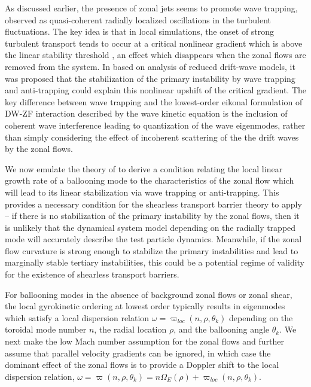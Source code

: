 \documentclass[]{article}
\begin{document}
As discussed earlier, the presence of zonal jets seems to promote wave trapping, observed as quasi-coherent radially localized oscillations in the turbulent fluctuations.
The key idea is that in local simulations, the onset of strong turbulent transport tends to occur at a critical nonlinear gradient which is above the linear stability threshold \citep{dimits_comparisons_2000}, an effect which disappears when the zonal flows are removed from the system.
In \citet{zhu_theory_2020,zhu_theory_jpp_2020} based on analysis of reduced drift-wave models, it was proposed that the stabilization of the primary instability by wave trapping and anti-trapping could explain this nonlinear upshift of the critical gradient.
The key difference between wave trapping and the lowest-order eikonal formulation of DW-ZF interaction described by the wave kinetic equation is the inclusion of coherent wave interference leading to quantization of the wave eigenmodes, rather than simply considering the effect of incoherent scattering of the the drift waves by the zonal flows.

We now emulate the theory of \citet{zhu_theory_2020} to derive a condition relating the local linear growth rate of a ballooning mode to the characteristics of the zonal flow which will lead to its linear stabilization via wave trapping or anti-trapping.
This provides a necessary condition for the shearless transport barrier theory to apply -- if there is no stabilization of the primary instability by the zonal flows, then it is unlikely that the dynamical system model depending on the radially trapped mode will accurately describe the test particle dynamics.
Meanwhile, if the zonal flow curvature is strong enough to stabilize the primary instabilities and lead to marginally stable tertiary instabilities, this could be a potential regime of validity for the existence of shearless transport barriers.

For ballooning modes in the absence of background zonal flows or zonal shear, the local gyrokinetic ordering at lowest order typically results in eigenmodes which satisfy a local dispersion relation \(\omega = \varpi_{loc}(n,\rho,\theta_k)\) depending on the toroidal mode number \(n\), the radial location \(\rho\), and the ballooning angle \(\theta_k\).
We next make the low Mach number assumption for the zonal flows and further assume that parallel velocity gradients can be ignored, in which case the dominant effect of the zonal flows is to provide a Doppler shift to the local dispersion relation, \(\omega = \varpi(n,\rho,\theta_k) = n \Omega_E(\rho) + \varpi_{loc}(n,\rho,\theta_k)\).
\end{document}

